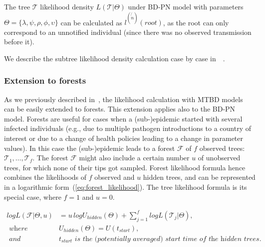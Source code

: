 \documentclass[10pt,letterpaper]{article}
\begin{document}
The tree $\mathscr{T}$ likelihood density $L(\mathscr{T}|\Theta)$ under BD-PN model with parameters $\Theta=\{\lambda, \psi, \rho, \phi, \upsilon\}$ can be calculated as $l^{(\not{n})}(root)$, as the root can only correspond to an unnotified individual (since there was no observed transmission before it).

We describe the subtree likelihood density calculation case by case in~~.




\bigskip





\subsubsection*{Extension to forests}

As we previously described in~\cite{zhukovaFastAccurateMaximumLikelihood2022}, the likelihood calculation with MTBD models can be easily extended to forests. This extension applies also to the BD-PN model. Forests are useful for cases when a (sub-)epidemic started with several infected individuals (e.g., due to multiple pathogen introductions to a country of interest or due to a change of health policies leading to a change in parameter values). In this case the (sub-)epidemic leads to a forest $\mathscr{F}$ of $f$ observed trees: $\mathscr{T}_1, \ldots, \mathscr{T}_f$. The forest $\mathscr{F}$ might also include a certain number $u$ of unobserved trees, for which none of their tips got sampled.
Forest likelihood formula hence combines the likelihoods of $f$ observed and $u$ hidden trees, and can be represented in a logarithmic form~(\ref{eq:forest_likelihood}). The tree likelihood formula %
is its special case, where $f=1$ and $u=0$. 


\begin{equation}
\begin{split}
logL(\mathscr{F}|\Theta,u)&=u\,logU_{hidden}(\Theta) + \sum\limits_{j=1}^f logL(\mathscr{T}_j|\Theta), \\
\textit{ where }& U_{hidden}(\Theta)=U(t_{start}),\\
\textit{ and }& t_{start} \textit{ is the (potentially averaged) start time of the hidden trees.}
\end{split} \label{eq:forest_likelihood} 
\end{equation}
\end{document}

